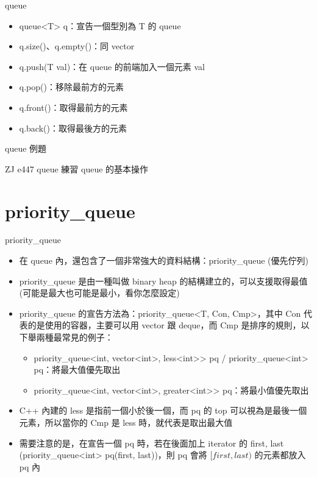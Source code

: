 \documentclass[aspectratio=169]{beamer}
\begin{document}
    \begin{frame}{queue}
        \begin{itemize}
            \item<1-> queue<T> q：宣告一個型別為 T 的 queue
            \item<1-> q.size()、q.empty()：同 vector
            \item<2-> q.push(T val)：在 queue 的前端加入一個元素 val
            \item<2-> q.pop()：移除最前方的元素
            \item<3-> q.front()：取得最前方的元素
            \item<3-> q.back()：取得最後方的元素
        \end{itemize}
    \end{frame}

    \begin{frame}{queue 例題}
        \begin{block}{ZJ e447 queue 練習}
            queue 的基本操作
        \end{block}
    \end{frame}

    \section{priority\_queue}

    \begin{frame}{priority\_queue}
        \begin{itemize}
            \item<1-> 在 queue 內，還包含了一個非常強大的資料結構：priority\_queue (優先佇列)
            \item<2-> priority\_queue 是由一種叫做 binary heap 的結構建立的，可以支援取得最值 (可能是最大也可能是最小，看你怎麼設定)
            \item<3-> priority\_queue 的宣告方法為：priority\_queue<T, Con, Cmp>，其中 Con 代表的是使用的容器，主要可以用 vector 跟 deque，而 Cmp 是排序的規則，以下舉兩種最常見的例子：
            \begin{itemize}
                \item<4-> priority\_queue<int, vector<int>, less<int>> pq / priority\_queue<int> pq：將最大值優先取出
                \item<4-> priority\_queue<int, vector<int>, greater<int>> pq：將最小值優先取出
            \end{itemize}
            \item<5-> C++ 內建的 less 是指前一個小於後一個，而 pq 的 top 可以視為是最後一個元素，所以當你的 Cmp 是 less 時，就代表是取出最大值
            \item<6-> 需要注意的是，在宣告一個 pq 時，若在後面加上 iterator 的 first, last (priority\_queue<int> pq(first, last))，則 pq 會將 $[first, last)$ 的元素都放入 pq 內
        \end{itemize}
    \end{frame}
\end{document}
